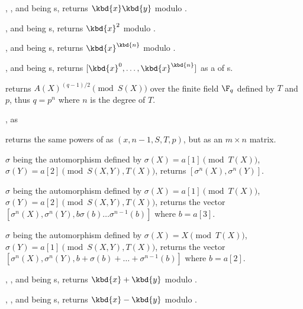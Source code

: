 , ,  and
 being s, returns $\kbd{x}\*\kbd{y}$ modulo .

,  and
 being s, returns $\kbd{x}^2$ modulo .

,  and
 being s, returns $\kbd{x}^\kbd{n}$ modulo .

,  and
 being s, returns $[\kbd{x}^0, \dots, \kbd{x}^\kbd{n}]$ as a
 of s.

 returns
$A(X)^{(q-1)/2}\pmod{S(X)}$ over the finite field $\F_q$ defined by $T$
and $p$, thus $q=p^n$ where $n$ is the degree of $T$.

, as

returns the same powers of  as $(x, n-1,S, T, p)$,
but as an $m\times n$ matrix.

$\sigma$ being the automorphism defined by $\sigma(X)=a[1]\pmod{T(X)}$,
$\sigma(Y)=a[2]\pmod{S(X,Y),T(X)}$, returns $[\sigma^n(X),\sigma^n(Y)]$.

$\sigma$ being the automorphism defined by $\sigma(X)=a[1]\pmod{T(X)}$,
$\sigma(Y)=a[2]\pmod{S(X,Y),T(X)}$, returns the vector
$[\sigma^n(X),\sigma^n(Y),b\sigma(b)\ldots\sigma^{n-1}(b)]$
where $b=a[3]$.

$\sigma$ being the automorphism defined by $\sigma(X)=X\pmod{T(X)}$,
$\sigma(Y)=a[1]\pmod{S(X,Y),T(X)}$, returns the vector
$[\sigma^n(X),\sigma^n(Y),b+\sigma(b)+\ldots+\sigma^{n-1}(b)]$
where $b=a[2]$.


, ,  and
 being s, returns $\kbd{x} + \kbd{y}$ modulo .

, ,  and
 being s, returns $\kbd{x} - \kbd{y}$ modulo .

